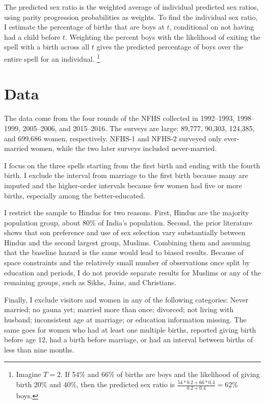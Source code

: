 \documentclass[12pt,letterpaper]{article}
\begin{document}
The predicted sex ratio is the weighted average of individual predicted sex ratios, using 
parity progression probabilities as weights.
To find the individual sex ratio, I estimate the percentage of births that are boys at $t$, 
conditional on not having had a child before $t$.
Weighting the percent boys with the likelihood of exiting the spell with a birth across all 
$t$ gives the predicted percentage of boys over the entire spell for an individual.%
\footnote{
Imagine $T=2$. 
If 54\% and 66\% of births are boys and the likelihood of giving birth 20\% and 40\%, 
then the predicted sex ratio is $\frac{54*0.2+66*0.4}{0.2+0.4} = 62$\% boys. 
}



\section{Data\label{sec:data}}

The data come from the four rounds of the NFHS
collected in 1992--1993, 1998--1999, 2005--2006, and 2015--2016.
The surveys are large: 89,777, 90,303, 124,385, and 699,686 women, respectively. 
NFHS-1 and NFHS-2 surveyed only ever-married women, while the two later surveys included 
never-married.

I focus on the three spells starting from the first birth and ending with the 
fourth birth.
I exclude the interval from marriage to the first birth because many are imputed and the
higher-order intervals because few women had five or more births, especially among the 
better-educated.

I restrict the sample to Hindus for two reasons.
First, Hindus are the majority population group, about 80\% of India’s population.
Second, the prior literature shows that son preference and use of sex selection vary 
substantially between Hindus and the second largest group, Muslims. 
Combining them and assuming that the baseline hazard is the same would lead to biased 
results.
Because of space constraints and the relatively small number of observations once split 
by education and periods, I do not provide separate results for Muslims or any of the 
remaining groups, such as Sikhs, Jains, and Christians.

Finally, I exclude visitors and women in any of the following categories: Never married; 
no gauna yet; married more than once; divorced; not living with husband; inconsistent age 
at marriage; or education information missing.  
The same goes for women who had at least one multiple births, reported giving birth 
before age 12, had a birth before marriage, or had an interval between births of less than 
nine months. 
\end{document}
